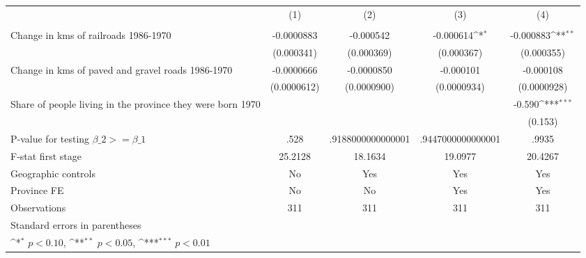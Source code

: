 {
\def\sym#1{\ifmmode^{#1}\else\(^{#1}\)\fi}
\begin{tabular}{l*{4}{c}}
\hline\hline
                &\multicolumn{1}{c}{(1)}&\multicolumn{1}{c}{(2)}&\multicolumn{1}{c}{(3)}&\multicolumn{1}{c}{(4)}\\
                &\multicolumn{1}{c}{}&\multicolumn{1}{c}{}&\multicolumn{1}{c}{}&\multicolumn{1}{c}{}\\
\hline
Change in kms of railroads 1986-1970&-0.0000883         &-0.000542         &-0.000614\sym{*}  &-0.000883\sym{**} \\
                &(0.000341)         &(0.000369)         &(0.000367)         &(0.000355)         \\
[1em]
Change in kms of paved and gravel roads 1986-1970&-0.0000666         &-0.0000850         &-0.000101         &-0.000108         \\
                &(0.0000612)         &(0.0000900)         &(0.0000934)         &(0.0000928)         \\
[1em]
Share of people living in the province they were born 1970&                  &                  &                  &   -0.590\sym{***}\\
                &                  &                  &                  &  (0.153)         \\
\hline
P-value for testing $\beta\_{2} >= \beta\_{1}$&     .528         &.9188000000000001         &.9447000000000001         &    .9935         \\
F-stat first stage&  25.2128         &  18.1634         &  19.0977         &  20.4267         \\
Geographic controls&       No         &      Yes         &      Yes         &      Yes         \\
Province FE     &       No         &       No         &      Yes         &      Yes         \\
Observations    &      311         &      311         &      311         &      311         \\
\hline\hline
\multicolumn{5}{l}{\footnotesize Standard errors in parentheses}\\
\multicolumn{5}{l}{\footnotesize \sym{*} \(p<0.10\), \sym{**} \(p<0.05\), \sym{***} \(p<0.01\)}\\
\end{tabular}
}
